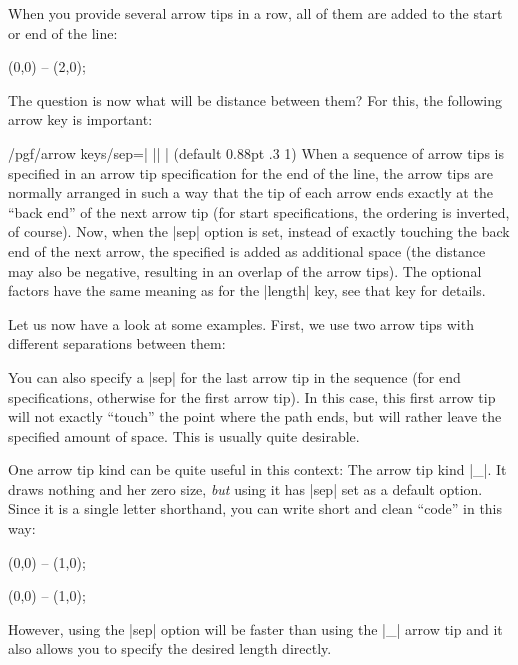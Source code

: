 When you provide several arrow tips in a row, all of them are added to
the start or end of the line:
\begin{codeexample}[]
\tikz \draw [<<<->>>>] (0,0) -- (2,0);
\end{codeexample}
The question is now what will be distance between them? For this, the
following arrow key is important:
\begin{key}{/pgf/arrow keys/sep=| || | (default 0.88pt .3 1)}
  When a sequence of arrow tips is specified in an arrow tip
  specification for the end of the line, the arrow tips are normally
  arranged in such a way that the tip of each arrow ends exactly at
  the ``back end'' of the next arrow tip (for start specifications,
  the ordering is inverted, of course). Now, when the |sep| option is
  set, instead of exactly touching the back end of the next arrow, the
  specified  is added as additional space (the
  distance may also be negative, resulting in an overlap of the arrow
  tips). The optional factors have the same meaning as for the
  |length| key, see that key for details.

  Let us now have a look at some examples. First, we use two arrow
  tips with different separations between them:
\begin{codeexample}[]
\end{codeexample}

  You can also specify a |sep| for the last arrow tip in the sequence
  (for end specifications, otherwise for the first arrow tip). In this
  case, this first arrow tip will not exactly ``touch'' the point
  where the path ends, but will rather leave the specified amount of
  space. This is usually quite desirable.
\begin{codeexample}[]
\end{codeexample}

  One arrow tip kind can be quite useful in this context: The arrow
  tip kind |_|. It draws nothing and her zero size, \emph{but} using
  it has |sep| set as a default option. Since it is a single letter
  shorthand, you can write short and clean ``code'' in this way:
\begin{codeexample}[]  
\tikz \draw [->_>] (0,0) -- (1,0);
\end{codeexample}
\begin{codeexample}[]  
\tikz \draw [->__>] (0,0) -- (1,0);
\end{codeexample}
  However, using the |sep| option will be faster than using the |_|
  arrow tip and it also allows you to specify the desired length
  directly. 
\end{key}




